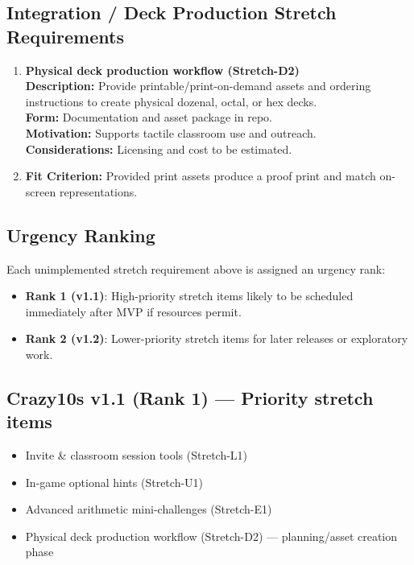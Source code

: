 \documentclass[12pt]{article}
\begin{document}
\subsection{Integration / Deck Production Stretch Requirements}
\begin{enumerate}
  \item \textbf{Physical deck production workflow (Stretch-D2)}\\
  \textbf{Description:} Provide printable/print-on-demand assets and ordering instructions to create physical dozenal, octal, or hex decks.\\
  \textbf{Form:} Documentation and asset package in repo.\\
  \textbf{Motivation:} Supports tactile classroom use and outreach.\\
  \textbf{Considerations:} Licensing and cost to be estimated.\\
  \item \textbf{Fit Criterion:} Provided print assets produce a proof print and match on-screen representations.
\end{enumerate}


\subsection{Urgency Ranking}
Each unimplemented stretch requirement above is assigned an urgency rank:
\begin{itemize}
  \item \textbf{Rank 1 (v1.1)}: High-priority stretch items likely to be scheduled immediately after MVP if resources permit.
  \item \textbf{Rank 2 (v1.2)}: Lower-priority stretch items for later releases or exploratory work.
\end{itemize}

\subsection{Crazy10s v1.1 (Rank 1) --- Priority stretch items}
\begin{itemize}
  \item Invite \& classroom session tools (Stretch-L1)
  \item In-game optional hints (Stretch-U1)
  \item Advanced arithmetic mini-challenges (Stretch-E1)
  \item Physical deck production workflow (Stretch-D2) --- planning/asset creation phase
\end{itemize}
\end{document}
